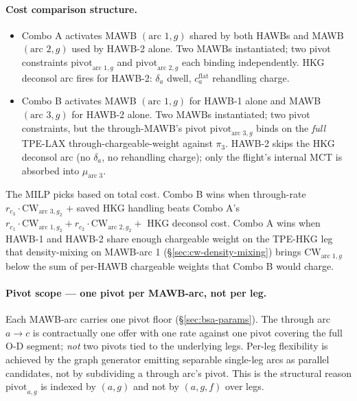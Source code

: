 \documentclass[11pt,a4paper]{article}
\theoremstyle{definition}
\begin{document}
\paragraph{Cost comparison structure.}
\begin{itemize}[noitemsep]
  \item Combo A activates MAWB $(\text{arc 1}, g)$ shared by both HAWBs
        and MAWB $(\text{arc 2}, g)$ used by HAWB-2 alone. Two MAWBs
        instantiated; two pivot constraints
        $\text{pivot}_{\text{arc 1}, g}$ and $\text{pivot}_{\text{arc 2},
        g}$ each binding independently. HKG deconsol arc fires for HAWB-2:
        $\delta_a$ dwell, $c_a^{\text{flat}}$ rehandling charge.
  \item Combo B activates MAWB $(\text{arc 1}, g)$ for HAWB-1 alone and
        MAWB $(\text{arc 3}, g)$ for HAWB-2 alone. Two MAWBs instantiated;
        two pivot constraints, but the through-MAWB's pivot
        $\text{pivot}_{\text{arc 3}, g}$ binds on the \emph{full} TPE-LAX
        through-chargeable-weight against $\pi_3$. HAWB-2 skips the HKG
        deconsol arc (no $\delta_a$, no rehandling charge); only the
        flight's internal MCT is absorbed into $\mu_{\text{arc 3}}$.
\end{itemize}
The MILP picks based on total cost. Combo B wins when through-rate $r_{c_3}
\cdot \text{CW}_{\text{arc 3}, g_2}$ + saved HKG handling beats Combo A's
$r_{c_1} \cdot \text{CW}_{\text{arc 1}, g_2} + r_{c_2} \cdot
\text{CW}_{\text{arc 2}, g_2} + $ HKG deconsol cost. Combo A wins when
HAWB-1 and HAWB-2 share enough chargeable weight on the TPE-HKG leg that
density-mixing on MAWB-arc 1 (\S\ref{sec:cw-density-mixing}) brings
$\text{CW}_{\text{arc 1}, g}$ below the sum of per-HAWB chargeable weights
that Combo B would charge.

\paragraph{Pivot scope --- one pivot per MAWB-arc, not per leg.}
Each MAWB-arc carries one pivot floor (\S\ref{sec:bsa-params}). The
through arc $a \to c$ is contractually one offer with one rate against
one pivot covering the full O-D segment; \emph{not} two pivots tied to
the underlying legs. Per-leg flexibility is achieved by the graph
generator emitting separable single-leg arcs as parallel candidates, not
by subdividing a through arc's pivot. This is the structural reason
$\text{pivot}_{a, g}$ is indexed by $(a, g)$ and not by $(a, g, f)$ over
legs.
\end{document}
